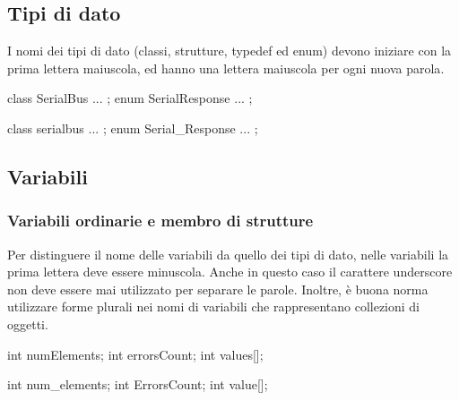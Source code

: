 \subsection{Tipi di dato}\label{ssec:typename}

I nomi dei tipi di dato (classi, strutture, typedef ed enum) devono iniziare con la prima lettera maiuscola, ed hanno una lettera maiuscola per ogni nuova parola\cite{codestyle:camel}.

\noindent\begin{minipage}[t]{\cbwidth}
\begin{RightCode}
class SerialBus { ... };
enum SerialResponse { ... };
\end{RightCode}
\end{minipage}%
\hspace{\cbdistance}
\begin{minipage}[t]{\cbwidth}
\begin{ErrorCode}
class serialbus { ... };
enum Serial_Response { ... };
\end{ErrorCode}
\end{minipage}

\subsection{Variabili}\label{ssec:variable}

\subsubsection{Variabili ordinarie e membro di strutture}\label{sssec:varnorm}

Per distinguere il nome delle variabili da quello dei tipi di dato, nelle variabili la prima lettera deve essere minuscola.
Anche in questo caso il carattere underscore non deve essere mai utilizzato per separare le parole.
Inoltre, è buona norma utilizzare forme plurali nei nomi di variabili che rappresentano collezioni di oggetti.

\noindent\begin{minipage}[t]{\cbwidth}
\begin{RightCode}
int numElements;
int errorsCount;
int values[];
\end{RightCode}
\end{minipage}%
\hspace{\cbdistance}
\begin{minipage}[t]{\cbwidth}
\begin{ErrorCode}
int num_elements;
int ErrorsCount;
int value[];
\end{ErrorCode}
\end{minipage}

